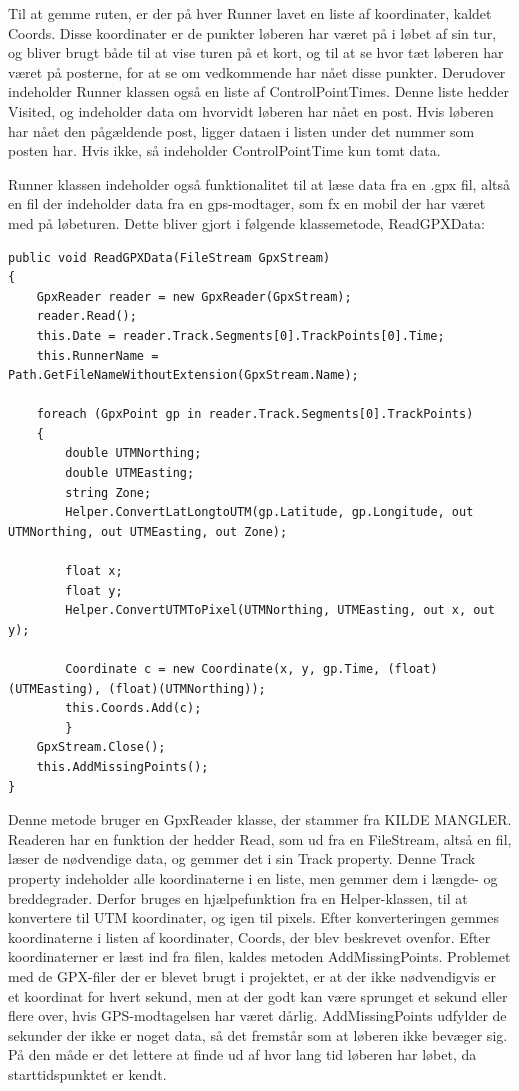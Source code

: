 Til at gemme ruten, er der på hver Runner lavet en liste af koordinater, kaldet Coords.
Disse koordinater er de punkter løberen har været på i løbet af sin tur, og bliver brugt både til at vise turen på et kort, og til at se hvor tæt løberen har været på posterne, for at se om vedkommende har nået disse punkter.
Derudover indeholder Runner klassen også en liste af ControlPointTimes. Denne liste hedder Visited, og indeholder data om hvorvidt løberen har nået en post. Hvis løberen har nået den pågældende post, ligger dataen i listen under det nummer som posten har. Hvis ikke, så indeholder ControlPointTime kun tomt data. 
 

Runner klassen indeholder også funktionalitet til at læse data fra en .gpx fil, altså en fil der indeholder data fra en gps-modtager, som fx en mobil der har været med på løbeturen.
Dette bliver gjort i følgende klassemetode, ReadGPXData:


\begin{lstlisting}
public void ReadGPXData(FileStream GpxStream)
{
	GpxReader reader = new GpxReader(GpxStream);
	reader.Read();
	this.Date = reader.Track.Segments[0].TrackPoints[0].Time;
	this.RunnerName = Path.GetFileNameWithoutExtension(GpxStream.Name);

	foreach (GpxPoint gp in reader.Track.Segments[0].TrackPoints)
	{
		double UTMNorthing;
		double UTMEasting;
		string Zone;
        Helper.ConvertLatLongtoUTM(gp.Latitude, gp.Longitude, out UTMNorthing, out UTMEasting, out Zone);

        float x;
        float y;
        Helper.ConvertUTMToPixel(UTMNorthing, UTMEasting, out x, out y);

        Coordinate c = new Coordinate(x, y, gp.Time, (float)(UTMEasting), (float)(UTMNorthing));
        this.Coords.Add(c);
        }
    GpxStream.Close();
    this.AddMissingPoints();
}
\end{lstlisting}

Denne metode bruger en GpxReader klasse, der stammer fra KILDE MANGLER. Readeren har en funktion der hedder Read, som ud fra en FileStream, altså en fil, læser de nødvendige data, og gemmer det i sin Track property. Denne Track property indeholder alle koordinaterne i en liste, men gemmer dem i længde- og breddegrader. Derfor bruges en hjælpefunktion fra en Helper-klassen, til at konvertere til UTM koordinater, og igen til pixels. Efter konverteringen gemmes koordinaterne i listen af koordinater, Coords, der blev beskrevet ovenfor. 
Efter koordinaterner er læst ind fra filen, kaldes metoden AddMissingPoints. Problemet med de GPX-filer der er blevet brugt i projektet, er at der ikke nødvendigvis er et koordinat for hvert sekund, men at der godt kan være sprunget et sekund eller flere over, hvis GPS-modtagelsen har været dårlig. AddMissingPoints udfylder de sekunder der ikke er noget data, så det fremstår som at løberen ikke bevæger sig. På den måde er det lettere at finde ud af hvor lang tid løberen har løbet, da starttidspunktet er kendt.
 
